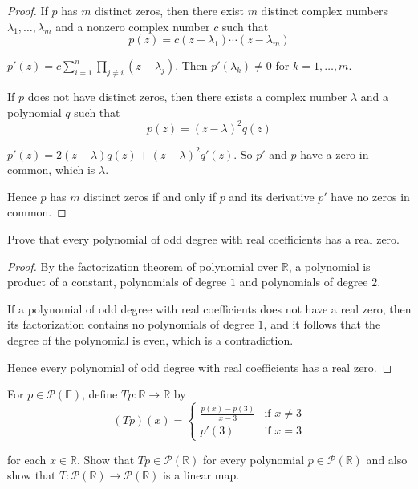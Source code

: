 \begin{proof}
    If $p$ has $m$ distinct zeros, then there exist $m$ distinct complex numbers $\lambda_{1}, \ldots, \lambda_{m}$ and a nonzero complex number $c$ such that
    \[
        p(z) = c(z - \lambda_{1})\cdots (z - \lambda_{m})
    \]

    $p'(z) = c\sum^{n}_{i=1}\prod_{j\ne i}(z - \lambda_{j})$. Then $p'(\lambda_{k})\ne 0$ for $k = 1, \ldots, m$.

    If $p$ does not have distinct zeros, then there exists a complex number $\lambda$ and a polynomial $q$ such that
    \[
        p(z) = {(z - \lambda)}^{2}q(z)
    \]

    $p'(z) = 2(z - \lambda)q(z) + {(z - \lambda)}^{2}q'(z)$. So $p'$ and $p$ have a zero in common, which is $\lambda$.

    Hence $p$ has $m$ distinct zeros if and only if $p$ and its derivative $p'$ have no zeros in common.
\end{proof}
\newpage

\begin{exercise}
    Prove that every polynomial of odd degree with real coefficients has a real zero.
\end{exercise}

\begin{proof}
    By the factorization theorem of polynomial over $\mathbb{R}$, a polynomial is product of a constant, polynomials of degree $1$ and polynomials of degree $2$.

    If a polynomial of odd degree with real coefficients does not have a real zero, then its factorization contains no polynomials of degree $1$, and it follows that the degree of the polynomial is even, which is a contradiction.

    Hence every polynomial of odd degree with real coefficients has a real zero.
\end{proof}
\newpage

\begin{exercise}
    For $p\in\mathscr{P}(\mathbb{F})$, define $Tp: \mathbb{R}\to \mathbb{R}$ by
    \[
        (Tp)(x) = \begin{cases}
            \frac{p(x) - p(3)}{x - 3} & \text{if $x\ne 3$} \\
            p'(3)                     & \text{if $x = 3$}
        \end{cases}
    \]

    for each $x\in\mathbb{R}$. Show that $Tp\in\mathscr{P}(\mathbb{R})$ for every polynomial $p\in\mathscr{P}(\mathbb{R})$ and also show that $T: \mathscr{P}(\mathbb{R})\to \mathscr{P}(\mathbb{R})$ is a linear map.
\end{exercise}

